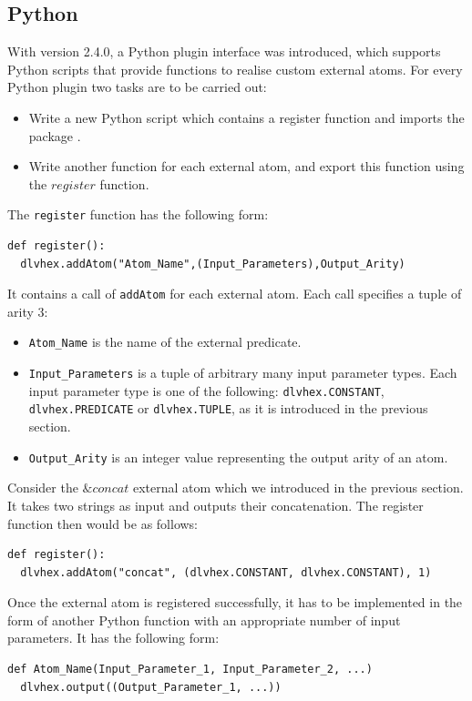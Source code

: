 \documentclass[a4paper, titlepage]{article}
\begin{document}
\subsection{Python}
With \dlvhex{} version 2.4.0, a Python plugin interface was 
introduced, which supports Python scripts that provide 
functions to realise custom external atoms. For every Python plugin two tasks are to be carried out:
\begin{itemize}
\item Write a new Python script which contains a register function and imports the package \dlvhex{}.
\item Write another function for each external atom, and export this function using the $\mathit{register}$ function. 
\end{itemize}
The \verb+register+ function has the following form:
\begin{verbatim} 
def register():
  dlvhex.addAtom("Atom_Name",(Input_Parameters),Output_Arity) 
\end{verbatim}
It contains a call of \verb+addAtom+ for each external atom. Each call specifies a tuple of arity 3:
\begin{itemize}
\item \verb+Atom_Name+ is the name of the 
external predicate.
\item \verb+Input_Parameters+ is a tuple of arbitrary many input parameter types. Each input parameter type is one of the 
following: \verb+dlvhex.CONSTANT+, \verb+dlvhex.PREDICATE+ or 
\verb+dlvhex.TUPLE+, as it is introduced in the previous section.
\item \verb+Output_Arity+ is an integer value representing the output arity of an atom.  
\end{itemize}
Consider the $\mathit{\&concat}$ external atom which we introduced in the previous section. It takes two strings as input and outputs their concatenation. The register function then would be as follows:
\begin{verbatim}
def register():
  dlvhex.addAtom("concat", (dlvhex.CONSTANT, dlvhex.CONSTANT), 1)  
\end{verbatim}
Once the external atom is registered successfully, it has 
to be implemented in the form of another Python function 
with an appropriate number of input parameters. It has the 
following form:  
\begin{verbatim}
def Atom_Name(Input_Parameter_1, Input_Parameter_2, ...)
  dlvhex.output((Output_Parameter_1, ...))
\end{verbatim}
\end{document}
